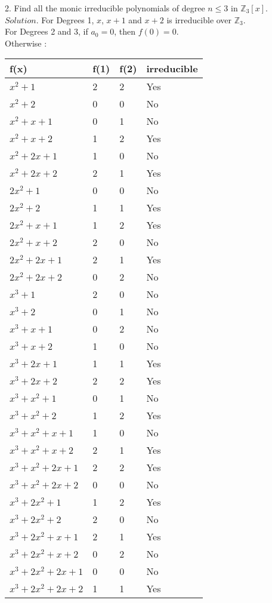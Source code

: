\documentclass[12pt]{book}
\begin{document}
\begin{CJK}{UTF8}{bsmi}
2. Find all the monic irreducible polynomials of degree $n\le3$ in $\mathbb{Z}_3[x]$. \\
$Solution$. For Degrees 1, $x$, $x+1$ and $x+2$ is irreducible over $\mathbb{Z}_3$. \\

For Degrees 2 and 3, if $a_0=0$, then $f(0)=0$. \\
Otherwise : \\
\begin{tabular}{l|l|l|l}
    f(x) & f(1) & f(2) & irreducible \\
    \hline
    $     x^2   +1$   & 2 & 2 & Yes \\
    $     x^2   +2$   & 0 & 0 & No \\
    $     x^2+ x+1$   & 0 & 1 & No \\
    $     x^2+ x+2$   & 1 & 2 & Yes \\
    $     x^2+2x+1$   & 1 & 0 & No \\
    $     x^2+2x+2$   & 2 & 1 & Yes \\
    $    2x^2   +1$   & 0 & 0 & No \\
    $    2x^2   +2$   & 1 & 1 & Yes \\
    $    2x^2+ x+1$   & 1 & 2 & Yes \\
    $    2x^2+ x+2$   & 2 & 0 & No \\
    $    2x^2+2x+1$   & 2 & 1 & Yes \\
    $    2x^2+2x+2$   & 0 & 2 & No \\
    $x^3        +1$   & 2 & 0 & No \\
    $x^3        +2$   & 0 & 1 & No \\
    $x^3     + x+1$   & 0 & 2 & No \\
    $x^3     + x+2$   & 1 & 0 & No \\
    $x^3     +2x+1$   & 1 & 1 & Yes \\
    $x^3     +2x+2$   & 2 & 2 & Yes \\
    $x^3+ x^2   +1$   & 0 & 1 & No \\
    $x^3+ x^2   +2$   & 1 & 2 & Yes \\
    $x^3+ x^2+ x+1$   & 1 & 0 & No \\
    $x^3+ x^2+ x+2$   & 2 & 1 & Yes \\
    $x^3+ x^2+2x+1$   & 2 & 2 & Yes \\
    $x^3+ x^2+2x+2$   & 0 & 0 & No \\
    $x^3+2x^2   +1$   & 1 & 2 & Yes \\
    $x^3+2x^2   +2$   & 2 & 0 & No \\
    $x^3+2x^2+ x+1$   & 2 & 1 & Yes \\
    $x^3+2x^2+ x+2$   & 0 & 2 & No \\
    $x^3+2x^2+2x+1$   & 0 & 0 & No \\
    $x^3+2x^2+2x+2$   & 1 & 1 & Yes 
\end{tabular} \\


\end{CJK}
\end{document}
